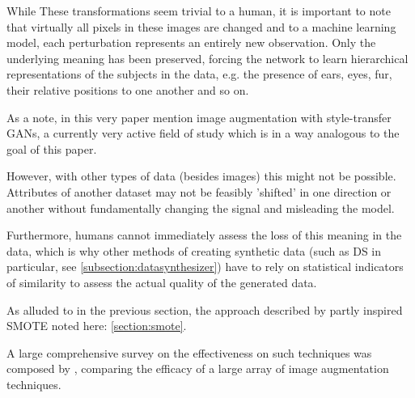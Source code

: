 
While These transformations seem trivial to a human, it is important to note that virtually all pixels in these images are changed and to a machine learning model, each perturbation represents an entirely new observation. 
Only the underlying meaning has been preserved, forcing the network to learn hierarchical representations of the subjects in the data, e.g. the presence of ears, eyes, fur, their relative positions to one another and so on. 

As a note, in this very paper \cite{perez2017effectiveness} mention image augmentation with style-transfer \acp{GAN}, a currently very active field of study which is in a way analogous to the goal of this paper.

\pagebreak

However, with other types of data (besides images) this might not be possible. Attributes of another dataset may not be feasibly 'shifted' in one direction or another without fundamentally changing the signal and misleading the model. 

Furthermore, humans cannot immediately assess the loss of this meaning in the data, which is why other methods of creating synthetic data (such as \ac{DS} in particular, see \ref{subsection:datasynthesizer}) have to rely on statistical indicators of similarity to assess the actual quality of the generated data.

As alluded to in the previous section, the approach described by \cite{image_augmentation} partly inspired \ac{SMOTE} noted here: \ref{section:smote}.

A large comprehensive survey on the effectiveness on such techniques was composed by \cite{shorten2019survey}, comparing the efficacy of a large array of image augmentation techniques.
